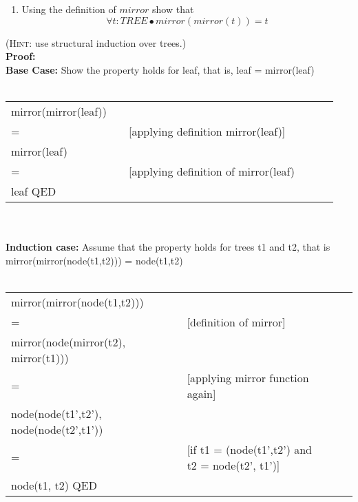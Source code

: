 \documentclass{article}
\begin{document}
\begin{enumerate}[\bf I.]
\begin{enumerate}
\item Using the definition of $mirror$ show that
\[\forall t: TREE \bullet mirror(mirror(t)) = t\]
\end{enumerate}
(\textsc{Hint}: use structural induction over trees.)
\\
\textbf{Proof:}\\
\textbf{Base Case:} Show the property holds for leaf, that is, leaf = mirror(leaf) \\
\\
\begin{tabular}{l ll lll}
     mirror(mirror(leaf)) &    &  \\
     = &   & [applying definition mirror(leaf)] \\
     mirror(leaf) & &  \\
     =   &    & [applying definition of mirror(leaf) \\
     leaf QED \\
\end{tabular} \\
\\
\textbf{Induction case:} Assume that the property holds for trees t1 and t2, that is mirror(mirror(node(t1,t2))) = node(t1,t2) \\
\\
\begin{tabular}{l ll lll}
     mirror(mirror(node(t1,t2)))  &    &  \\
     = &   & [definition of mirror] \\
     mirror(node(mirror(t2), mirror(t1))) & & \\
     = &   & [applying mirror function again] \\
     node(node(t1',t2'), node(node(t2',t1')) & & \\
     = &  & [if t1 = (node(t1',t2') and t2 = node(t2', t1')] \\
    node(t1, t2) QED
\end{tabular} \\
\\

\end{enumerate}
\end{document}
